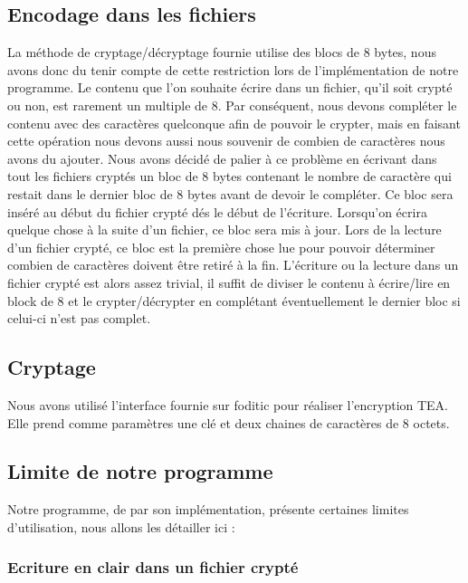 \documentclass[10pt, onecolumn] {IEEEtran}
\begin{document}
\subsection{Encodage dans les fichiers}

La méthode de cryptage/décryptage fournie utilise des blocs de 8 bytes, nous avons donc du tenir compte de cette restriction lors de l'implémentation de notre programme. Le contenu que l'on souhaite écrire dans un fichier, qu'il soit crypté ou non, est rarement un multiple de 8. Par conséquent, nous devons compléter le contenu avec des caractères quelconque afin de pouvoir le crypter, mais en faisant cette opération nous devons aussi nous souvenir de combien de caractères nous avons du ajouter. Nous avons décidé de palier à ce problème en écrivant dans tout les fichiers cryptés un bloc de 8 bytes contenant le nombre de caractère qui restait dans le dernier bloc de 8 bytes avant de devoir le compléter. Ce bloc sera inséré au début du fichier crypté dés le début de l'écriture. Lorsqu'on écrira quelque chose à la suite d'un fichier, ce bloc sera mis à jour. Lors de la lecture d'un fichier crypté, ce bloc est la première chose lue pour pouvoir déterminer combien de caractères doivent être retiré à la fin.
L'écriture ou la lecture dans un fichier crypté est alors assez trivial, il suffit de diviser le contenu à écrire/lire en block de 8 et le crypter/décrypter en complétant éventuellement le dernier bloc si celui-ci n'est pas complet.

\subsection{Cryptage}

Nous avons utilisé l'interface fournie sur foditic pour réaliser l'encryption TEA. Elle prend comme paramètres une clé et deux chaines de caractères de 8 octets.

\subsection{Limite de notre programme}

Notre programme, de par son implémentation, présente certaines limites d'utilisation, nous allons les détailler ici :
\subsubsection{Ecriture en clair dans un fichier crypté}
\end{document}
